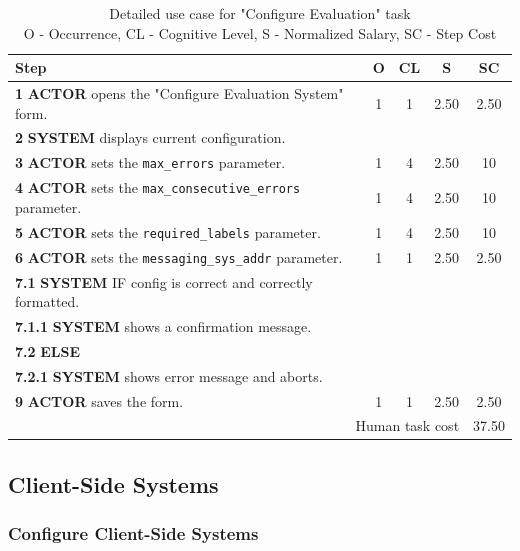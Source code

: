 \begin{table}[H]
    \centering
    \begin{tabularx}{\textwidth}{|X|c|c|c|c|}
    \hline
    \textbf{Step} & \textbf{O} & \textbf{CL} & \textbf{S} & \textbf{SC} \\
    \hline
    \textbf{1} \textbf{ACTOR} opens the "Configure Evaluation System" form. & 1 & 1 & 2.50 & 2.50 \\
    \hline
    \textbf{2} \textbf{SYSTEM} displays current configuration. & & & & \\
    \hline
    \textbf{3} \textbf{ACTOR} sets the \texttt{max\_errors} parameter. & 1 & 4 & 2.50 & 10 \\
    \hline
    \textbf{4} \textbf{ACTOR} sets the \texttt{max\_consecutive\_errors} parameter. & 1 & 4 & 2.50 & 10 \\
    \hline
    \textbf{5} \textbf{ACTOR} sets the \texttt{required\_labels} parameter. & 1 & 4 & 2.50 & 10 \\
    \hline
    \textbf{6} \textbf{ACTOR} sets the \texttt{messaging\_sys\_addr} parameter. & 1 & 1 & 2.50 & 2.50 \\
    \hline
    \textbf{7.1} \textbf{SYSTEM} IF config is correct and correctly formatted. & & & & \\
    \hline
    \textbf{7.1.1} \textbf{SYSTEM} shows a confirmation message. & & & & \\
    \hline
    \textbf{7.2} \textbf{ELSE} & & & & \\
    \hline
    \textbf{7.2.1} \textbf{SYSTEM} shows error message and aborts. & & & & \\
    \hline
    \textbf{9} \textbf{ACTOR} saves the form. & 1 & 1 & 2.50 & 2.50  \\
    \hline
    \multicolumn{4}{|r|}{Human task cost} & 37.50 \\
    \hline
    \end{tabularx}
    \caption{Detailed use case for "Configure Evaluation" task\\ 
    O - Occurrence, CL - Cognitive Level, S - Normalized Salary, SC - Step Cost}
    \label{table:configure_evaluation_system}
    \end{table}

\subsection{ Client-Side Systems}

\subsubsection{Configure Client-Side Systems}

